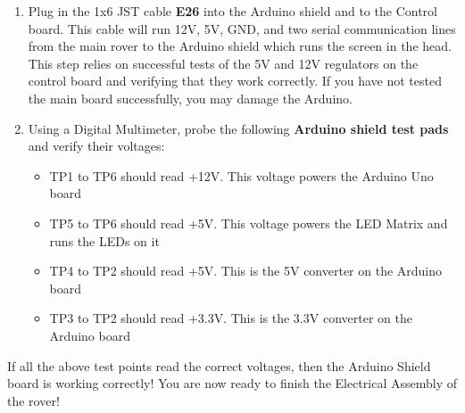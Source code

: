 \documentclass{article}
\begin{document}
\begin{enumerate}

	\item Plug in the 1x6 JST cable \textbf{E26} into the Arduino shield and to the Control board. This cable will run 12V, 5V, GND, and two serial communication lines from the main rover to the Arduino shield which runs the screen in the head. This step relies on successful tests of the 5V and 12V regulators on the control board and verifying that they work correctly.  If you have not tested the main board successfully, you may damage the Arduino.

	\item Using a Digital Multimeter, probe the following \textbf{Arduino shield test pads} and verify their voltages:
		\begin{itemize}
			\item TP1 to TP6 should read +12V. This voltage powers the Arduino Uno board
			\item TP5 to TP6 should read +5V. This voltage powers the LED Matrix and runs the LEDs on it
			\item TP4 to TP2 should read +5V. This is the 5V converter on the Arduino board
			\item TP3 to TP2 should read +3.3V. This is the 3.3V converter on the Arduino board
				
		\end{itemize}

\end{enumerate}

If all the above test points read the correct voltages, then the Arduino Shield board is working correctly!  You are now ready to finish the Electrical Assembly of the rover!
\end{document}

